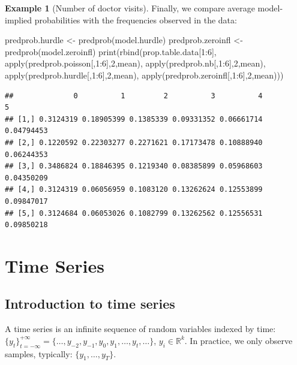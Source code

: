\documentclass[
  12pt,
]{book}
\newenvironment{Shaded}{\begin{snugshade}}{\end{snugshade}}
\newcommand{\DecValTok}[1]{\textcolor[rgb]{0.00,0.00,0.81}{#1}}
\newcommand{\FunctionTok}[1]{\textcolor[rgb]{0.00,0.00,0.00}{#1}}
\newcommand{\NormalTok}[1]{#1}
\newcommand{\OtherTok}[1]{\textcolor[rgb]{0.56,0.35,0.01}{#1}}
\newcommand{\SpecialCharTok}[1]{\textcolor[rgb]{0.00,0.00,0.00}{#1}}
\theoremstyle{definition}
\theoremstyle{definition}
\newtheorem{example}{Example}[chapter]
\theoremstyle{definition}
\theoremstyle{definition}
\theoremstyle{remark}
\begin{document}
\begin{example}[Number of doctor visits]
Finally, we compare average model-implied probabilities with the frequencies observed in the data:

\begin{Shaded}
\begin{Highlighting}[]
\NormalTok{predprob.hurdle   }\OtherTok{\textless{}{-}} \FunctionTok{predprob}\NormalTok{(model.hurdle)}
\NormalTok{predprob.zeroinfl }\OtherTok{\textless{}{-}} \FunctionTok{predprob}\NormalTok{(model.zeroinfl)}
\FunctionTok{print}\NormalTok{(}\FunctionTok{rbind}\NormalTok{(prop.table.data[}\DecValTok{1}\SpecialCharTok{:}\DecValTok{6}\NormalTok{],}
  \FunctionTok{apply}\NormalTok{(predprob.poisson[,}\DecValTok{1}\SpecialCharTok{:}\DecValTok{6}\NormalTok{],}\DecValTok{2}\NormalTok{,mean),}
  \FunctionTok{apply}\NormalTok{(predprob.nb[,}\DecValTok{1}\SpecialCharTok{:}\DecValTok{6}\NormalTok{],}\DecValTok{2}\NormalTok{,mean),}
  \FunctionTok{apply}\NormalTok{(predprob.hurdle[,}\DecValTok{1}\SpecialCharTok{:}\DecValTok{6}\NormalTok{],}\DecValTok{2}\NormalTok{,mean),}
  \FunctionTok{apply}\NormalTok{(predprob.zeroinfl[,}\DecValTok{1}\SpecialCharTok{:}\DecValTok{6}\NormalTok{],}\DecValTok{2}\NormalTok{,mean)))}
\end{Highlighting}
\end{Shaded}

\begin{verbatim}
##              0          1         2          3          4          5
## [1,] 0.3124319 0.18905399 0.1385339 0.09331352 0.06661714 0.04794453
## [2,] 0.1220592 0.22303277 0.2271621 0.17173478 0.10888940 0.06244353
## [3,] 0.3486824 0.18846395 0.1219340 0.08385899 0.05968603 0.04350209
## [4,] 0.3124319 0.06056959 0.1083120 0.13262624 0.12553899 0.09847017
## [5,] 0.3124684 0.06053026 0.1082799 0.13262562 0.12556531 0.09850218
\end{verbatim}

\end{example}

\hypertarget{TS}{%
\chapter{Time Series}\label{TS}}

\hypertarget{introduction-to-time-series}{%
\section{Introduction to time series}\label{introduction-to-time-series}}

A time series is an infinite sequence of random variables indexed by time: \(\{y_t\}_{t=-\infty}^{+\infty}=\{\dots, y_{-2},y_{-1},y_{0},y_{1},\dots,y_t,\dots\}\), \(y_i \in \mathbb{R}^k\). In practice, we only observe samples, typically: \(\{y_{1},\dots,y_T\}\).
\end{document}

